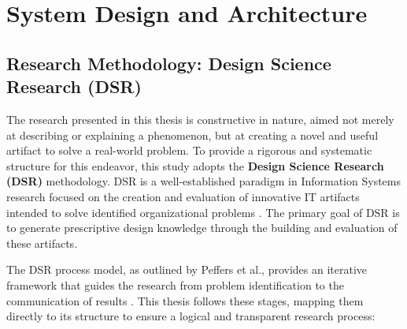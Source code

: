 \chapter{System Design and Architecture}
\label{chap:system_design}



\section{Research Methodology: Design Science Research (DSR)}
\label{sec:dsr_methodology}

The research presented in this thesis is constructive in nature, aimed not merely at describing or explaining a phenomenon, but at creating a novel and useful artifact to solve a real-world problem. To provide a rigorous and systematic structure for this endeavor, this study adopts the \textbf{Design Science Research (DSR)} methodology. DSR is a well-established paradigm in Information Systems research focused on the creation and evaluation of innovative IT artifacts intended to solve identified organizational problems \cite{dsr_methodology_hevner_2004}. The primary goal of DSR is to generate prescriptive design knowledge through the building and evaluation of these artifacts.

The DSR process model, as outlined by Peffers et al., provides an iterative framework that guides the research from problem identification to the communication of results \cite{dsr_methodology_peers_2006}. This thesis follows these stages, mapping them directly to its structure to ensure a logical and transparent research process:

